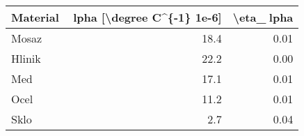 \begin{tabular}{lrr}
\toprule
Material &  lpha [\textbackslash degree C\textasciicircum \{-1\} 1e-6] &  \textbackslash eta\_lpha \\
\midrule
   Mosaz &                         18.4 &        0.01 \\
  Hlinik &                         22.2 &        0.00 \\
     Med &                         17.1 &        0.01 \\
    Ocel &                         11.2 &        0.01 \\
    Sklo &                          2.7 &        0.04 \\
\bottomrule
\end{tabular}
